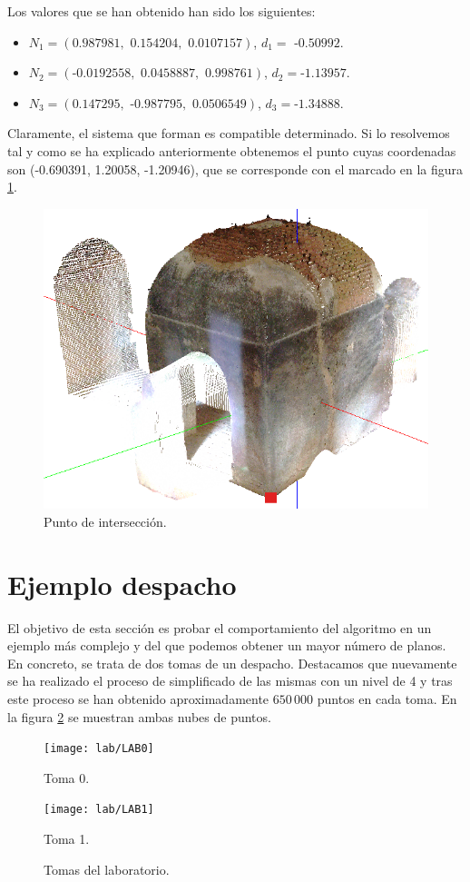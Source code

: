 Los valores que se han obtenido han sido los siguientes:
\begin{itemize}
\item $ N_1 = ( \text{0.987981}, \text{ 0.154204}, \text{ 0.0107157}) $, $ d_1 = \text{ -0.50992} $.
\item $ N_2 = ( \text{-0.0192558}, \text{ 0.0458887}, \text{ 0.998761}) $, $ d_2 = \text{-1.13957} $.
\item $ N_3 = ( \text{0.147295}, \text{ -0.987795}, \text{ 0.0506549}) $, $ d_3 = \text{-1.34888}$.
\end{itemize}
Claramente, el sistema que forman es compatible determinado. Si lo resolvemos tal y como se ha explicado anteriormente obtenemos el punto cuyas coordenadas son (-0.690391, 1.20058, -1.20946), que se corresponde con el marcado en la figura \ref{fig:torre1-4}.
\begin{figure}
	\centering
	\includegraphics[width=0.4\linewidth]{imagenes/Ej-RANSAC/torre_1-4}
	\caption{Punto de intersección.}
	\label{fig:torre1-4}
\end{figure}


\section{Ejemplo despacho}
El objetivo de esta sección es probar el comportamiento del algoritmo en un ejemplo más complejo y del que podemos obtener un mayor número de planos. En concreto, se trata de dos tomas de un despacho. Destacamos que nuevamente se ha realizado el proceso de simplificado de las mismas con un nivel de 4 y tras este proceso se han obtenido aproximadamente $ 650\,000 $ puntos en cada toma. En la figura \ref{fig:tomasLab} se muestran ambas nubes de puntos. \\

\begin{figure}[h!]
	\begin{minipage}[b]{0.5\textwidth}
		\centering
		\texttt{[image: lab/LAB0]} 
		\caption*{Toma 0.}
	\end{minipage}
	\begin{minipage}[b]{0.5\textwidth}
		\centering
		\texttt{[image: lab/LAB1]} 
		\caption*{Toma 1.}
	\end{minipage}
	\caption{Tomas del laboratorio.}
	\label{fig:tomasLab}
\end{figure}

